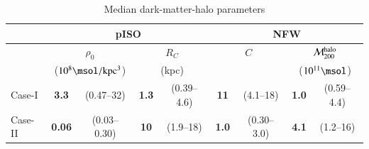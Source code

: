 %
%
%
\begin{table}
\caption{\label{tab:DMpars}
Median dark-matter-halo parameters} 
\centering
%
\renewcommand{\tabcolsep}{1.0mm}
%
{\tiny
\begin{tabular}{|l |c c |c c |c c |c c|}
\hline
%
\multicolumn{1}{|c}{}                               &
\multicolumn{4}{|c}{pISO}                           &
\multicolumn{4}{|c|}{NFW}                           \\
\hline
\multicolumn{1}{|c}{}                               &
\multicolumn{2}{|c}{$\rho_0$}                       &
\multicolumn{2}{|c}{$R_C$}                          &
\multicolumn{2}{|c|}{$C$}                           &
\multicolumn{2}{c|}{$\mathcal{M}_{200}^{\rm halo}$} \\
\multicolumn{1}{|c}{}                               &
\multicolumn{2}{|c}{($10^{8}\msol/{\rm kpc^3}$)}    &
\multicolumn{2}{|c}{(kpc)}                          &
\multicolumn{2}{|c|}{}                              &
\multicolumn{2}{c|}{($10^{11}\msol$)}               \\
\hline
Case-I  & \bf{3.3}  & (0.47--32)   & \bf{1.3} & (0.39--4.6) & \bf{11}  & (4.1--18)   & \bf{1.0} & (0.59--4.4) \\
Case-II & \bf{0.06} & (0.03--0.30) & \bf{10}  & (1.9--18)   & \bf{1.0} & (0.30--3.0) & \bf{4.1} & (1.2--16)  \\
\hline
\end{tabular}
}
%
\end{table}
